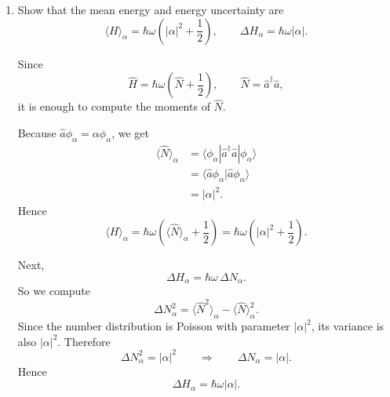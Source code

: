 \documentclass[11pt,a4paper]{scrartcl}
\newcommand{\abs}[1]{\left| #1 \right|}
\begin{document}
\begin{enumerate}[label=(\alph*)]
    \begin{solutionbox}
    The amplitude for the level $n$ is
    \[
    \langle \varphi_n|\phi_\alpha\rangle
    = e^{-|\alpha|^2/2}\frac{\alpha^n}{\sqrt{n!}}.
    \]
    Therefore the probability is
    \begin{align*}
        P_n
        &= \abs{\langle \varphi_n|\phi_\alpha\rangle}^2 \\
        &= e^{-|\alpha|^2}\frac{|\alpha|^{2n}}{n!}.
    \end{align*}
    This is precisely a Poisson distribution with parameter
    \[
    \lambda=|\alpha|^2.
    \]
    \end{solutionbox}

    \begin{answerbox}
    \[
    \boxed{
    P_n = e^{-|\alpha|^2}\frac{|\alpha|^{2n}}{n!}.
    }
    \]
    Thus the energy measurement statistics in a coherent state are Poissonian.
    \end{answerbox}

    \item Show that the mean energy and energy uncertainty are
    \[
    \langle H\rangle_\alpha = \hbar\omega\left(|\alpha|^2+\frac12\right),
    \qquad
    \Delta H_\alpha = \hbar\omega |\alpha|.
    \]

    \begin{calculationbox}
    Since
    \[
    \hat H = \hbar\omega\left(\hat N+\frac12\right),
    \qquad \hat N=\hat a^\dagger \hat a,
    \]
    it is enough to compute the moments of $\hat N$.

    Because $\hat a\phi_\alpha=\alpha\phi_\alpha$, we get
    \begin{align*}
        \langle \hat N\rangle_\alpha
        &= \langle \phi_\alpha|\hat a^\dagger\hat a|\phi_\alpha\rangle \\
        &= \langle \hat a\phi_\alpha|\hat a\phi_\alpha\rangle \\
        &= |\alpha|^2.
    \end{align*}
    Hence
    \[
    \langle H\rangle_\alpha
    = \hbar\omega\left(\langle \hat N\rangle_\alpha+\frac12\right)
    = \hbar\omega\left(|\alpha|^2+\frac12\right).
    \]

    Next,
    \[
    \Delta H_\alpha = \hbar\omega\,\Delta N_\alpha.
    \]
    So we compute
    \[
    \Delta N_\alpha^2 = \langle \hat N^2\rangle_\alpha - \langle \hat N\rangle_\alpha^2.
    \]
    Since the number distribution is Poisson with parameter $|\alpha|^2$, its variance is also $|\alpha|^2$. Therefore
    \[
    \Delta N_\alpha^2 = |\alpha|^2
    \qquad \Rightarrow \qquad
    \Delta N_\alpha = |\alpha|.
    \]
    Hence
    \[
    \boxed{\Delta H_\alpha = \hbar\omega |\alpha|.}
    \]


\end{calculationbox}
\end{enumerate}
\end{document}
